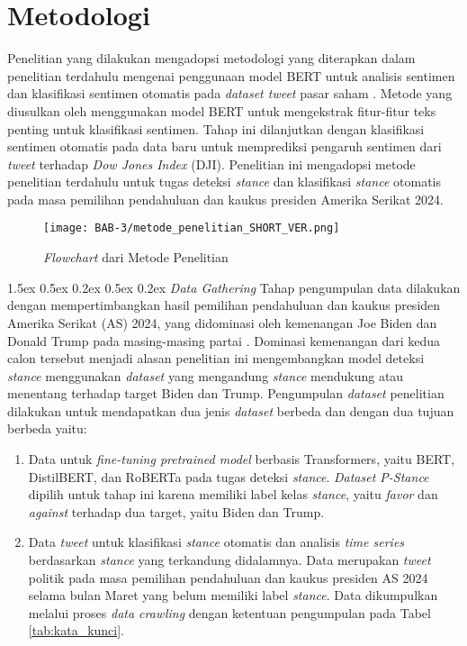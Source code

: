 \documentclass[journal]{IEEEtran}
\makeatletter
\renewcommand\subsection{\@startsection{subsection}{2}{\z@}%
  {1.5ex \@plus 0.5ex \@minus 0.2ex}%
  {0.5ex \@plus 0.2ex}%
  {\normalfont\normalsize\bfseries}}
\makeatother
\begin{document}
\section{Metodologi}
\label{sec:metodologi}
Penelitian yang dilakukan mengadopsi metodologi yang diterapkan dalam penelitian terdahulu mengenai penggunaan model BERT untuk analisis sentimen dan klasifikasi sentimen otomatis pada \textit{dataset tweet} pasar saham \citep{sousa2019bert}. Metode yang diusulkan oleh \cite{sousa2019bert} menggunakan model BERT untuk mengekstrak fitur-fitur teks penting untuk klasifikasi sentimen. Tahap ini dilanjutkan dengan klasifikasi sentimen otomatis pada data baru untuk memprediksi pengaruh sentimen dari \textit{tweet} terhadap \textit{Dow Jones Index} (DJI). Penelitian ini mengadopsi metode penelitian terdahulu untuk tugas deteksi \textit{stance} dan klasifikasi \textit{stance} otomatis pada masa pemilihan pendahuluan dan kaukus presiden Amerika Serikat 2024.
\begin{figure}[H]
    \centering
    \texttt{[image: BAB-3/metode\_penelitian\_SHORT\_VER.png]}
    \caption{\textit{Flowchart} dari Metode Penelitian}
    \label{fig:metode_penelitian}
\end{figure}

\subsection{\textit{Data Gathering}}
Tahap pengumpulan data dilakukan dengan mempertimbangkan hasil pemilihan pendahuluan dan kaukus presiden Amerika Serikat (AS) 2024, yang didominasi oleh kemenangan Joe Biden dan Donald Trump pada masing-masing partai \citep{abcnews2024}. Dominasi kemenangan dari kedua calon tersebut menjadi alasan penelitian ini mengembangkan model deteksi \textit{stance} menggunakan \textit{dataset} yang mengandung \textit{stance} mendukung atau menentang terhadap target Biden dan Trump. Pengumpulan \textit{dataset} penelitian dilakukan untuk mendapatkan dua jenis \textit{dataset} berbeda dan dengan dua tujuan berbeda yaitu: 
\begin{enumerate}
    \item Data untuk \textit{fine-tuning pretrained model} berbasis Transformers, yaitu BERT, DistilBERT, dan RoBERTa pada tugas deteksi \textit{stance}. \textit{Dataset P-Stance} dipilih untuk tahap ini karena memiliki label kelas \textit{stance}, yaitu \textit{favor} dan \textit{against} terhadap dua target, yaitu Biden dan Trump. 
    \item Data \textit{tweet} untuk klasifikasi \textit{stance} otomatis dan analisis \textit{time series} berdasarkan \textit{stance} yang terkandung didalamnya. Data merupakan \textit{tweet} politik pada masa pemilihan pendahuluan dan kaukus presiden AS 2024 selama bulan Maret yang belum memiliki label \textit{stance}. Data dikumpulkan melalui proses \textit{data crawling} dengan ketentuan pengumpulan pada Tabel \ref{tab:kata_kunci}.
\end{enumerate}
\end{document}
